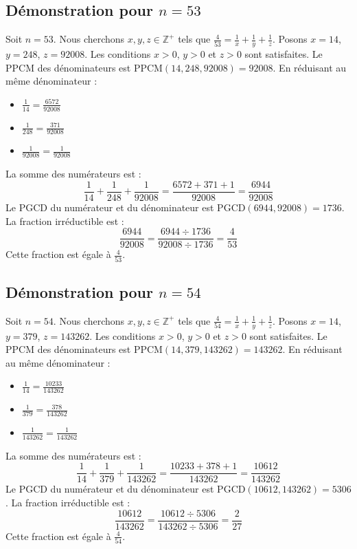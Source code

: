 \documentclass[11pt,a4paper]{article}
\begin{document}
\subsection{Démonstration pour $n = 53$}
Soit $n = 53$. Nous cherchons $x, y, z \in \mathbb{Z}^{+}$ tels que $\frac{4}{53} = \frac{1}{x} + \frac{1}{y} + \frac{1}{z}$.
Posons $x = 14$, $y = 248$, $z = 92008$.
Les conditions $x > 0$, $y > 0$ et $z > 0$ sont satisfaites.
Le PPCM des dénominateurs est $\text{PPCM}(14, 248, 92008) = 92008$.
En réduisant au même dénominateur :
\begin{itemize}
    \item $\frac{1}{14} = \frac{6572}{92008}$
    \item $\frac{1}{248} = \frac{371}{92008}$
    \item $\frac{1}{92008} = \frac{1}{92008}$
\end{itemize}
La somme des numérateurs est :
$$ \frac{1}{14} + \frac{1}{248} + \frac{1}{92008} = \frac{6572 + 371 + 1}{92008} = \frac{6944}{92008} $$
Le PGCD du numérateur et du dénominateur est $\text{PGCD}(6944, 92008) = 1736$.
La fraction irréductible est :
$$ \frac{6944}{92008} = \frac{6944 \div 1736}{92008 \div 1736} = \frac{4}{53} $$
Cette fraction est égale à $\frac{4}{53}$.

\subsection{Démonstration pour $n = 54$}
Soit $n = 54$. Nous cherchons $x, y, z \in \mathbb{Z}^{+}$ tels que $\frac{4}{54} = \frac{1}{x} + \frac{1}{y} + \frac{1}{z}$.
Posons $x = 14$, $y = 379$, $z = 143262$.
Les conditions $x > 0$, $y > 0$ et $z > 0$ sont satisfaites.
Le PPCM des dénominateurs est $\text{PPCM}(14, 379, 143262) = 143262$.
En réduisant au même dénominateur :
\begin{itemize}
    \item $\frac{1}{14} = \frac{10233}{143262}$
    \item $\frac{1}{379} = \frac{378}{143262}$
    \item $\frac{1}{143262} = \frac{1}{143262}$
\end{itemize}
La somme des numérateurs est :
$$ \frac{1}{14} + \frac{1}{379} + \frac{1}{143262} = \frac{10233 + 378 + 1}{143262} = \frac{10612}{143262} $$
Le PGCD du numérateur et du dénominateur est $\text{PGCD}(10612, 143262) = 5306$.
La fraction irréductible est :
$$ \frac{10612}{143262} = \frac{10612 \div 5306}{143262 \div 5306} = \frac{2}{27} $$
Cette fraction est égale à $\frac{4}{54}$.
\end{document}

